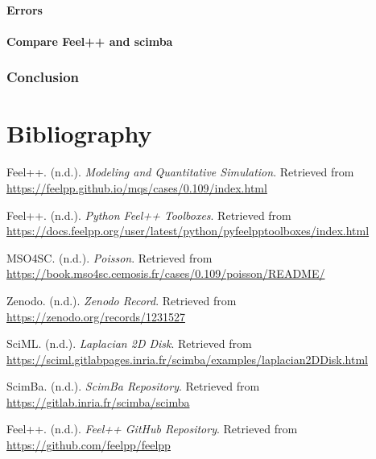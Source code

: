 \documentclass[12pt]{article}
\begin{document}
\begin{enumerate}
\newpage
\subsection{Errors}

\newpage
\subsection{Compare Feel++ and scimba}

\newpage

\section{Conclusion}


\newpage

\part*{Bibliography}



\begin{thebibliography}{14}

Feel++. (n.d.). \textit{Modeling and Quantitative Simulation}. Retrieved from \url{https://feelpp.github.io/mqs/cases/0.109/index.html}

Feel++. (n.d.). \textit{Python Feel++ Toolboxes}. Retrieved from \url{https://docs.feelpp.org/user/latest/python/pyfeelpptoolboxes/index.html}

MSO4SC. (n.d.). \textit{Poisson}. Retrieved from \url{https://book.mso4sc.cemosis.fr/cases/0.109/poisson/README/}

Zenodo. (n.d.). \textit{Zenodo Record}. Retrieved from \url{https://zenodo.org/records/1231527}


SciML. (n.d.). \textit{Laplacian 2D Disk}. Retrieved from \url{https://sciml.gitlabpages.inria.fr/scimba/examples/laplacian2DDisk.html}

ScimBa. (n.d.). \textit{ScimBa Repository}. Retrieved from \url{https://gitlab.inria.fr/scimba/scimba}

Feel++. (n.d.). \textit{Feel++ GitHub Repository}. Retrieved from \url{https://github.com/feelpp/feelpp}


\end{thebibliography}
\end{enumerate}
\end{document}
